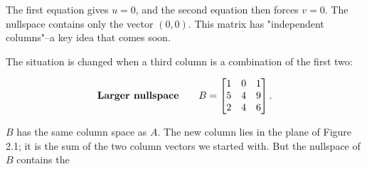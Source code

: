The first equation gives \(u=0\), and the second equation then forces \(v=0\). The nullspace contains only the vector \((0,0)\). This matrix has "independent columns"--a key idea that comes soon.

The situation is changed when a third column is a combination of the first two:

\[\text{\bf Larger nullspace}\qquad B=\begin{bmatrix}1&0&1\\ 5&4&9\\ 2&4&6\end{bmatrix}.\]

\(B\) has the same column space as \(A\). The new column lies in the plane of Figure 2.1; it is the sum of the two column vectors we started with. But the nullspace of \(B\) contains the 